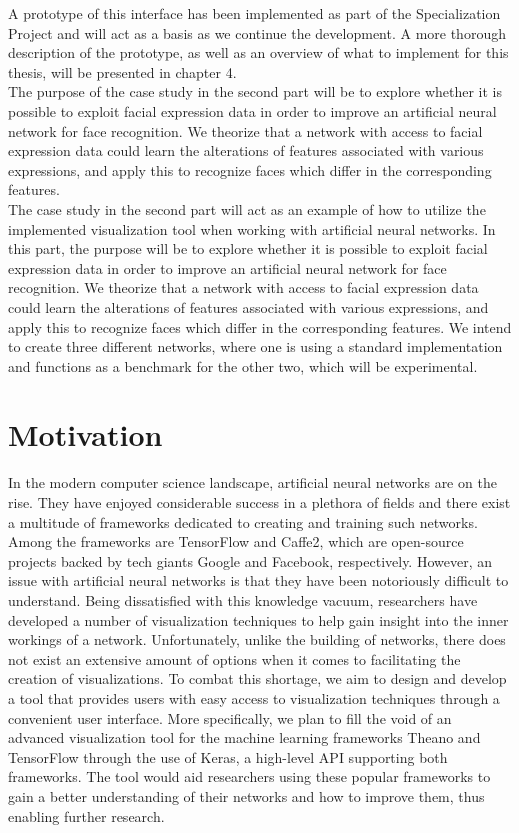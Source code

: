 \noindent A prototype of this interface has been implemented as part of the Specialization Project and will act as a basis as we continue the development. A more thorough description of the prototype, as well as an overview of what to implement for this thesis, will be presented in chapter 4. \\

\noindent The purpose of the case study in the second part will be to explore whether it is possible to exploit facial expression data in order to improve an artificial neural network for face recognition. We theorize that a network with access to facial expression data could learn the alterations of features associated with various expressions, and apply this to recognize faces which differ in the corresponding features. \\

\noindent The case study in the second part will act as an example of how to utilize the implemented visualization tool when working with artificial neural networks. In this part, the purpose will be to explore whether it is possible to exploit facial expression data in order to improve an artificial neural network for face recognition. We theorize that a network with access to facial expression data could learn the alterations of features associated with various expressions, and apply this to recognize faces which differ in the corresponding features. We intend to create three different networks, where one is using a standard implementation and functions as a benchmark for the other two, which will be experimental.


\section{Motivation}

\noindent In the modern computer science landscape, artificial neural networks are on the rise. They have enjoyed considerable success in a plethora of fields and there exist a multitude of frameworks dedicated to creating and training such networks. Among the frameworks are TensorFlow and Caffe2, which are open-source projects backed by tech giants Google and Facebook, respectively. However, an issue with artificial neural networks is that they have been notoriously difficult to understand. Being dissatisfied with this knowledge vacuum, researchers have developed a number of visualization techniques to help gain insight into the inner workings of a network. Unfortunately, unlike the building of networks, there does not exist an extensive amount of options when it comes to facilitating the creation of visualizations. To combat this shortage, we aim to design and develop a tool that provides users with easy access to visualization techniques through a convenient user interface. More specifically, we plan to fill the void of an advanced visualization tool for the machine learning frameworks Theano and TensorFlow through the use of Keras, a high-level API supporting both frameworks. The tool would aid researchers using these popular frameworks to gain a better understanding of their networks and how to improve them, thus enabling further research. \\


